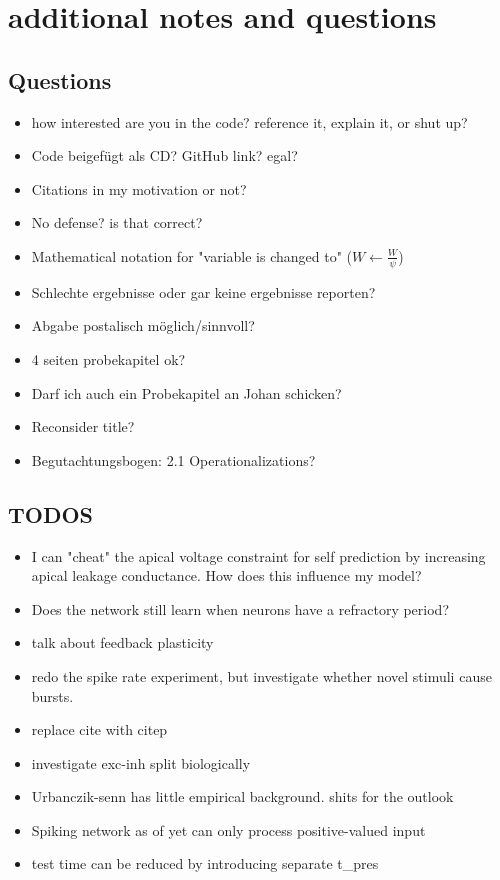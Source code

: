 \chapter{additional notes and questions}

\section{Questions}


\begin{itemize}
    \item how interested are you in the code? reference it, explain it, or shut up?
    \item Code beigefügt als CD? GitHub link? egal?
    \item Citations in my motivation or not?
    \item No defense? is that correct?
    \item Mathematical notation for "variable is changed to" ($W \leftarrow \frac{W}{\psi}$)
    \item Schlechte ergebnisse oder gar keine ergebnisse reporten?
    \item Abgabe postalisch möglich/sinnvoll?
    \item 4 seiten probekapitel ok?
    \item Darf ich auch ein Probekapitel an Johan schicken?
    \item Reconsider title?
    \item Begutachtungsbogen: 2.1 Operationalizations?
\end{itemize}


\section{TODOS}

\begin{itemize}
    \item I can "cheat" the apical voltage constraint for self prediction by increasing apical leakage conductance. How
    does this influence my model?
    \item Does the network still learn when neurons have a refractory period?
    \item talk about feedback plasticity
    \item redo the spike rate experiment, but investigate whether novel stimuli cause bursts.
    \item replace cite with citep
    \item investigate exc-inh split biologically
    \item Urbanczik-senn has little empirical background. shits for the outlook
    \item Spiking network as of yet can only process positive-valued input
    \item test time can be reduced by introducing separate t\_pres
\end{itemize}

